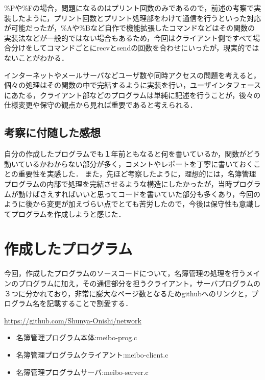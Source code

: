 \documentclass[a4j]{jarticle}
\begin{document}
\%Pや\%Fの場合，問題になるのはプリント回数のみであるので，前述の考察で実装したように，プリント回数とプリント処理部をわけて通信を行うといった対応が可能だったが，\%Aや\%Bなど自作で機能拡張したコマンドなどはその関数の実装法などが一般的ではない場合もあるため，今回はクライアント側ですべて場合分けをしてコマンドごとにrecvとsendの回数を合わせにいったが，現実的ではないことがわかる．

インターネットやメールサーバなどユーザ数や同時アクセスの問題を考えると，個々の処理はその関数の中で完結するように実装を行い，ユーザインタフェースにあたる，クライアント部などのプログラムは単純に記述を行うことが，後々の仕様変更や保守の観点から見れば重要であると考えられる．

\subsection{考察に付随した感想}
自分の作成したプログラムでも１年前ともなると何を書いているか，関数がどう動いているかわからない部分が多く，コメントやレポートを丁寧に書いておくことの重要性を実感した．
また，先ほど考察したように，理想的には，名簿管理プログラムの内部で処理を完結させるような構造にしたかったが，当時プログラムが動けばさえすればいいと思ってコードを書いていた部分も多くあり，今回のように後から変更が加えづらい点でとても苦労したので，今後は保守性も意識してプログラムを作成しようと感じた．


\section{作成したプログラム}
今回，作成したプログラムのソースコードについて，名簿管理の処理を行うメインのプログラムに加え，その通信部分を担うクライアント，サーバプログラムの３つに分かれており，非常に膨大なページ数となるためgithubへのリンクと，プログラム名を記載することで割愛する．

\url{https://github.com/Shunya-Onishi/network}

\begin{itemize}
\item 名簿管理プログラム本体:meibo-prog.c
\item 名簿管理プログラムクライアント:meibo-client.c
\item 名簿管理プログラムサーバ:meibo-server.c
\end{itemize}
\end{document}
